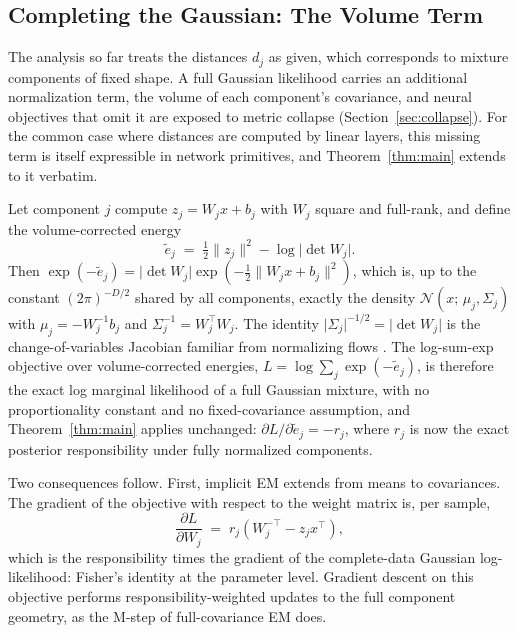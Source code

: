 \subsection{Completing the Gaussian: The Volume Term}
\label{sec:volume}

The analysis so far treats the distances $d_j$ as given, which corresponds to mixture components of fixed shape. A full Gaussian likelihood carries an additional normalization term, the volume of each component's covariance, and neural objectives that omit it are exposed to metric collapse (Section~\ref{sec:collapse}). For the common case where distances are computed by linear layers, this missing term is itself expressible in network primitives, and Theorem~\ref{thm:main} extends to it verbatim.

Let component $j$ compute $z_j = W_j x + b_j$ with $W_j$ square and full-rank, and define the volume-corrected energy
\begin{equation}
\tilde{e}_j \;=\; \tfrac{1}{2}\|z_j\|^2 - \log\lvert\det W_j\rvert.
\end{equation}
Then $\exp(-\tilde{e}_j) = \lvert\det W_j\rvert \exp(-\tfrac{1}{2}\|W_j x + b_j\|^2)$, which is, up to the constant $(2\pi)^{-D/2}$ shared by all components, exactly the density $\mathcal{N}(x;\, \mu_j, \Sigma_j)$ with $\mu_j = -W_j^{-1} b_j$ and $\Sigma_j^{-1} = W_j^\top W_j$. The identity $\lvert\Sigma_j\rvert^{-1/2} = \lvert\det W_j\rvert$ is the change-of-variables Jacobian familiar from normalizing flows \citep{rezende2015variational}. The log-sum-exp objective over volume-corrected energies, $L = \log \sum_j \exp(-\tilde{e}_j)$, is therefore the exact log marginal likelihood of a full Gaussian mixture, with no proportionality constant and no fixed-covariance assumption, and Theorem~\ref{thm:main} applies unchanged: $\partial L / \partial \tilde{e}_j = -r_j$, where $r_j$ is now the exact posterior responsibility under fully normalized components.

Two consequences follow. First, implicit EM extends from means to covariances. The gradient of the objective with respect to the weight matrix is, per sample,
\begin{equation}
\frac{\partial L}{\partial W_j} \;=\; r_j \left( W_j^{-\top} - z_j x^\top \right),
\end{equation}
which is the responsibility times the gradient of the complete-data Gaussian log-likelihood: Fisher's identity at the parameter level. Gradient descent on this objective performs responsibility-weighted updates to the full component geometry, as the M-step of full-covariance EM does.


